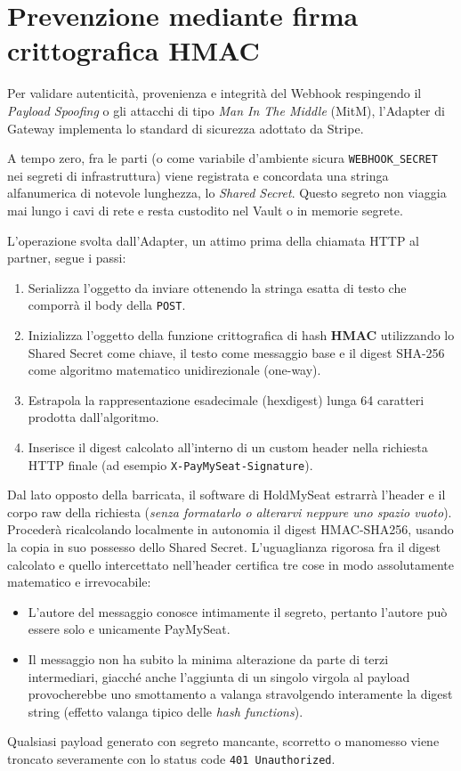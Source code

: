 \documentclass[11pt,a4paper]{report}
\begin{document}
\section{Prevenzione mediante firma crittografica HMAC}
Per validare autenticit\`a, provenienza e integrit\`a del Webhook respingendo il \textit{Payload Spoofing} o gli attacchi di tipo \textit{Man In The Middle} (MitM), l'Adapter di Gateway implementa lo standard di sicurezza adottato da Stripe.

A tempo zero, fra le parti (o come variabile d'ambiente sicura \texttt{WEBHOOK\_SECRET} nei segreti di infrastruttura) viene registrata e concordata una stringa alfanumerica di notevole lunghezza, lo \textit{Shared Secret}. Questo segreto non viaggia mai lungo i cavi di rete e resta custodito nel Vault o in memorie segrete.

L'operazione svolta dall'Adapter, un attimo prima della chiamata HTTP al partner, segue i passi:
\begin{enumerate}
    \item Serializza l'oggetto da inviare ottenendo la stringa esatta di testo che comporr\`a il body della \texttt{POST}.
    \item Inizializza l'oggetto della funzione crittografica di hash \textbf{HMAC} utilizzando lo Shared Secret come chiave, il testo come messaggio base e il digest SHA-256 come algoritmo matematico unidirezionale (one-way).
    \item Estrapola la rappresentazione esadecimale (hexdigest) lunga 64 caratteri prodotta dall'algoritmo.
    \item Inserisce il digest calcolato all'interno di un custom header nella richiesta HTTP finale (ad esempio \texttt{X-PayMySeat-Signature}).
\end{enumerate}

Dal lato opposto della barricata, il software di HoldMySeat estrarr\`a l'header e il corpo raw della richiesta (\textit{senza formatarlo o alterarvi neppure uno spazio vuoto}). Proceder\`a ricalcolando localmente in autonomia il digest HMAC-SHA256, usando la copia in suo possesso dello Shared Secret.
L'uguaglianza rigorosa fra il digest calcolato e quello intercettato nell'header certifica tre cose in modo assolutamente matematico e irrevocabile:
\begin{itemize}
    \item L'autore del messaggio conosce intimamente il segreto, pertanto l'autore pu\`o essere solo e unicamente PayMySeat.
    \item Il messaggio non ha subito la minima alterazione da parte di terzi intermediari, giacch\'e anche l'aggiunta di un singolo virgola al payload provocherebbe uno smottamento a valanga stravolgendo interamente la digest string (effetto valanga tipico delle \textit{hash functions}).
\end{itemize}
Qualsiasi payload generato con segreto mancante, scorretto o manomesso viene troncato severamente con lo status code \texttt{401 Unauthorized}.
\end{document}
